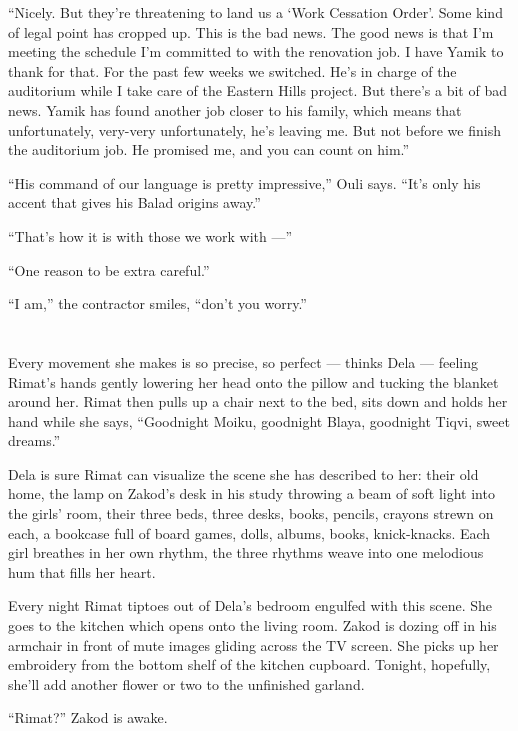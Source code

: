 \documentclass[twoside,11pt,openany]{book}
\begin{document}
``Nicely. But they're threatening to land us a `Work Cessation Order'. Some kind of legal point has cropped
up. This is the bad news. The good news is that I'm meeting the schedule I'm committed to with the renovation job.  I
have Yamik to thank for that. For the past few weeks we switched. He's in charge of the auditorium while I take care of
the Eastern Hills project. But there's a bit of bad news. Yamik has found another job closer to his family, which means
that unfortunately, very-very unfortunately, he's leaving me. But not before we finish the auditorium job. He
promised me, and you can count on him.''

``His command of our language is pretty impressive,'' Ouli says. ``It's only his
accent that gives his Balad origins away.''

``That's how it is with those we work with ---''

``One reason to be extra careful.''

``I am,'' the contractor smiles, ``don't you worry.''



\chapter{}

Every movement she makes is so precise, so perfect --- thinks Dela --- feeling Rimat's hands gently lowering her head onto
the pillow and tucking the blanket around her. Rimat then pulls up a chair next to the bed, sits down and holds her
hand while she says, ``Goodnight Moiku, goodnight Blaya, goodnight Tiqvi, sweet dreams.''

Dela is sure Rimat can visualize the scene she has described to her: their old home, the lamp on Zakod's desk in his
study throwing a beam of soft light into the girls{'} room, their three beds, three desks, 
books, pencils, crayons strewn on each, a bookcase full of board games, dolls, albums, books, knick-knacks. Each girl
breathes in her own rhythm, the three rhythms weave into one melodious hum that fills her heart.

Every night Rimat tiptoes out of Dela's bedroom engulfed with this scene. She goes to the kitchen which opens onto the
living room.  Zakod is dozing off in his armchair in front of mute images gliding across the TV screen. She picks up
her embroidery from the bottom shelf of the kitchen cupboard. Tonight, hopefully, she'll add another flower or two to
the unfinished garland.

``Rimat?'' Zakod is awake.
\end{document}
